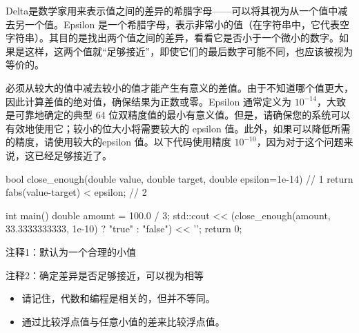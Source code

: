 Delta是数学家用来表示值之间的差异的希腊字母——可以将其视为从一个值中减去另一个值。Epsilon 是一个希腊字母，表示非常小的值（在字符串中，它代表空字符串）。其目的是找出两个值之间的差异，看看它是否小于一个微小的数字。如果是这样，这两个值就“足够接近”，即使它们的最后数字可能不同，也应该被视为等价的。

必须从较大的值中减去较小的值才能产生有意义的差值。由于不知道哪个值更大，因此计算差值的绝对值，确保结果为正数或零。Epsilon 通常定义为 $10^{-14}$，大致是可靠地确定的典型 64 位双精度值的最小有意义值。但是，请确保您的系统可以有效地使用它；较小的位大小将需要较大的 epsilon 值。此外，如果可以降低所需的精度，请使用较大的epsilon 值。以下代码使用精度 $10^{-10}$，因为对于这个问题来说，这已经足够接近了。


\begin{cpp}
bool close_enough(double value, double target, double epsilon=1e-14) { // 1
  return fabs(value-target) < epsilon; // 2
}

int main() {
  double amount = 100.0 / 3;
  std::cout << (close_enough(amount, 33.3333333333, 1e-10) ? "true" : "false") << '\n';
  return 0;
}
\end{cpp}

{\footnotesize
注释1：默认为一个合理的小值

注释2：确定差异是否足够接近，可以视为相等
}


\begin{itemize}
\item
请记住，代数和编程是相关的，但并不等同。

\item
通过比较浮点值与任意小值的差来比较浮点值。
\end{itemize}
